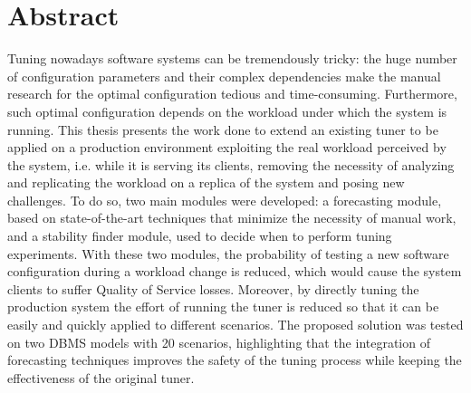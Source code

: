 \documentclass[a4paper, 12pt]{article} %
\begin{document}
	\section*{Abstract}
	Tuning nowadays software systems can be tremendously tricky: the huge number of configuration parameters and their complex dependencies make the manual research for the optimal configuration tedious and time-consuming. Furthermore, such optimal configuration depends on the workload under which the system is running. 
	This thesis presents the work done to extend an existing tuner to be applied on a production environment exploiting the real workload perceived by the system, i.e. while it is serving its clients, removing the necessity of analyzing and replicating the workload on a replica of the system and posing new challenges.
	To do so, two main modules were developed: a forecasting module, based on state-of-the-art techniques that minimize the necessity of manual work, and a stability finder module, used to decide when to perform tuning experiments. With these two modules, the probability of testing a new software configuration during a workload change is reduced, which would cause the system clients to suffer Quality of Service losses.
	Moreover, by directly tuning the production system the effort of running the tuner is reduced so that it can be easily and quickly applied to different scenarios.
	The proposed solution was tested on two DBMS models with 20 scenarios, highlighting that the integration of forecasting techniques improves the safety of the tuning process while keeping the effectiveness of the original tuner.
	
	\clearpage%
	\thispagestyle{empty}%
	\addtocounter{page}{-1}%
	\null%
	\clearpage
	
	\renewcommand{\contentsname}{Index}
	\newpage
	\thispagestyle{plain}
	\tableofcontents

	\clearpage%
	\thispagestyle{empty}%
	\addtocounter{page}{-1}%
	\null%
	\clearpage
	
	
	
	\newpage
	
\end{document}
